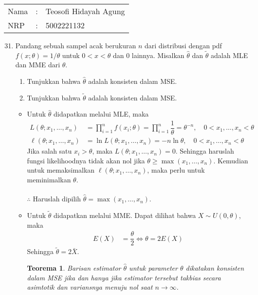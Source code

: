 \documentclass{exam}
\newtheorem{teorema}{Teorema}
\begin{document}
\begin{tabular}{|lcl|}
    \hline
    Nama&:&Teosofi Hidayah Agung\\
    NRP&:&5002221132\\
    \hline
\end{tabular}
\begin{enumerate}
    \setcounter{enumi}{30}
    \item Pandang sebuah sampel acak berukuran $n$ dari distribusi dengan pdf $f(x;\theta) = 1/\theta$ untuk $0 < x < \theta$ dan $0$ lainnya. Misalkan $\hat{\theta}$ dan $\tilde{\theta}$ adalah MLE dan MME dari $\theta$. 
    \begin{enumerate}
        \item Tunjukkan bahwa $\hat{\theta}$ adalah konsisten dalam MSE.
        \item Tunjukkan bahwa $\tilde{\theta}$ adalah konsisten dalam MSE.
    \end{enumerate}
    \begin{solution}
        \begin{itemize}
            \item Untuk $\hat{\theta}$ didapatkan melalui MLE, maka
            \begin{align*}
                L(\theta;x_1,\dots,x_n) &= \prod_{i=1}^n f(x_i;\theta)= \prod_{i=1}^n \dfrac{1}{\theta}= \theta^{-n}, \quad 0 < x_1,\dots,x_n < \theta\\
                \ell(\theta;x_1,\dots,x_n) &= \ln L(\theta;x_1,\dots,x_n) = -n\ln\theta, \quad 0 < x_1,\dots,x_n < \theta
            \end{align*}
            Jika salah satu $x_i > \theta$, maka $L(\theta;x_1,\dots,x_n) = 0$. Sehingga haruslah fungsi likelihoodnya tidak akan nol jika $\theta \geq \max(x_1,\dots,x_n)$. Kemudian untuk memaksimalkan $\ell(\theta;x_1,\dots,x_n)$, maka perlu untuk meminimalkan $\theta$. \\~\\
            $\therefore$ Haruslah dipilih $\hat{\theta} = \max(x_1,\dots,x_n)$.
            \item Untuk $\tilde{\theta}$ didapatkan melalui MME. Dapat dilihat bahwa $X\sim U(0,\theta)$, maka
            \begin{align*}
                E(X) &= \dfrac{\theta}{2}\iff \theta = 2E(X)
            \end{align*}
            Sehingga $\tilde{\theta} = 2\bar{X}$.
            \begin{teorema}
                Barisan estimator $\hat{\theta}$ untuk parameter $\theta$ dikatakan konsisten dalam MSE jika dan hanya jika estimator tersebut takbias secara asimtotik dan variansnya menuju nol saat $n\to\infty$.

\end{teorema}
\end{itemize}
\end{solution}
\end{enumerate}
\end{document}
